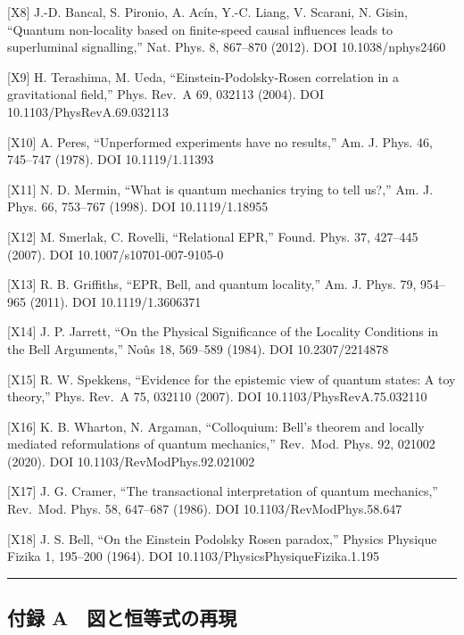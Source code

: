 \documentclass[
  a4paper,
]{ltjsarticle}
\begin{document}
{[}X8{]} J.-D. Bancal, S. Pironio, A. Acín, Y.-C. Liang, V. Scarani, N.
Gisin, ``Quantum non-locality based on finite-speed causal influences
leads to superluminal signalling,'' Nat. Phys. 8, 867--870 (2012). DOI
10.1038/nphys2460

{[}X9{]} H. Terashima, M. Ueda, ``Einstein-Podolsky-Rosen correlation in
a gravitational field,'' Phys. Rev.~A 69, 032113 (2004). DOI
10.1103/PhysRevA.69.032113

{[}X10{]} A. Peres, ``Unperformed experiments have no results,'' Am. J.
Phys. 46, 745--747 (1978). DOI 10.1119/1.11393

{[}X11{]} N. D. Mermin, ``What is quantum mechanics trying to tell
us?,'' Am. J. Phys. 66, 753--767 (1998). DOI 10.1119/1.18955

{[}X12{]} M. Smerlak, C. Rovelli, ``Relational EPR,'' Found. Phys. 37,
427--445 (2007). DOI 10.1007/s10701-007-9105-0

{[}X13{]} R. B. Griffiths, ``EPR, Bell, and quantum locality,'' Am. J.
Phys. 79, 954--965 (2011). DOI 10.1119/1.3606371

{[}X14{]} J. P. Jarrett, ``On the Physical Significance of the Locality
Conditions in the Bell Arguments,'' Noûs 18, 569--589 (1984). DOI
10.2307/2214878

{[}X15{]} R. W. Spekkens, ``Evidence for the epistemic view of quantum
states: A toy theory,'' Phys. Rev.~A 75, 032110 (2007). DOI
10.1103/PhysRevA.75.032110

{[}X16{]} K. B. Wharton, N. Argaman, ``Colloquium: Bell's theorem and
locally mediated reformulations of quantum mechanics,'' Rev.~Mod. Phys.
92, 021002 (2020). DOI 10.1103/RevModPhys.92.021002

{[}X17{]} J. G. Cramer, ``The transactional interpretation of quantum
mechanics,'' Rev.~Mod. Phys. 58, 647--687 (1986). DOI
10.1103/RevModPhys.58.647

{[}X18{]} J. S. Bell, ``On the Einstein Podolsky Rosen paradox,''
Physics Physique Fizika 1, 195--200 (1964). DOI
10.1103/PhysicsPhysiqueFizika.1.195

\begin{center}\rule{0.5\linewidth}{0.5pt}\end{center}

\subsection{付録
A　図と恒等式の再現}\label{ux4ed8ux9332-a-ux56f3ux3068ux6052ux7b49ux5f0fux306eux518dux73fe}
\end{document}
